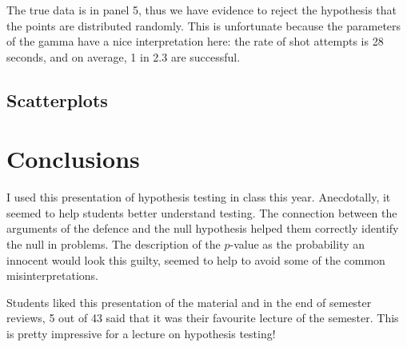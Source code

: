 \documentclass[oneside]{article}
\begin{document}
The true data is in panel 5, thus we have evidence to reject the hypothesis that the points are distributed randomly.  This is unfortunate because the parameters of the gamma have a nice interpretation here: the rate of shot attempts is 28 seconds, and on average, 1 in 2.3 are successful.

\subsection{Scatterplots}
\label{sub:bivariate}


\section{Conclusions}

I used this presentation of hypothesis testing in class this year. Anecdotally, it seemed to help students better understand testing. The connection between the arguments of the defence and the null hypothesis helped them correctly identify the null in problems. The description of the $p$-value as the probability an innocent would look this guilty, seemed to help to avoid some of the common misinterpretations.

Students liked this presentation of the material and in the end of semester reviews, 5 out of 43 said that it was their favourite lecture of the semester. This is pretty impressive for a lecture on hypothesis testing!


\end{document}

